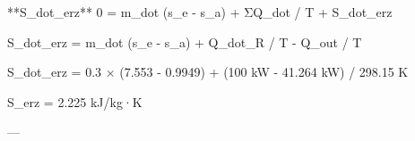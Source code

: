 **S_dot_erz**  
0 = m_dot (s_e - s_a) + ΣQ_dot / T + S_dot_erz  

S_dot_erz = m_dot (s_e - s_a) + Q_dot_R / T - Q_out / T  

S_dot_erz = 0.3 × (7.553 - 0.9949) + (100 kW - 41.264 kW) / 298.15 K  

S_erz = 2.225 kJ/kg·K  

---